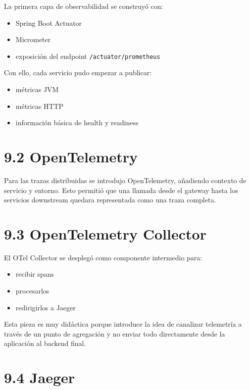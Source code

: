 \documentclass[
a4paper,
12pt]{report}
\providecommand{\tightlist}{%
  \setlength{\itemsep}{0pt}\setlength{\parskip}{0pt}}
\begin{document}
La primera capa de observabilidad se construyó con:

\begin{itemize}
\tightlist
\item
  Spring Boot Actuator
\item
  Micrometer
\item
  exposición del endpoint \texttt{/actuator/prometheus}
\end{itemize}

Con ello, cada servicio pudo empezar a publicar:

\begin{itemize}
\tightlist
\item
  métricas JVM
\item
  métricas HTTP
\item
  información básica de health y readiness
\end{itemize}

\section{9.2 OpenTelemetry}\label{opentelemetry}

Para las trazas distribuidas se introdujo OpenTelemetry, añadiendo
contexto de servicio y entorno. Esto permitió que una llamada desde el
gateway hasta los servicios downstream quedara representada como una
traza completa.

\section{9.3 OpenTelemetry Collector}\label{opentelemetry-collector}

El OTel Collector se desplegó como componente intermedio para:

\begin{itemize}
\tightlist
\item
  recibir spans
\item
  procesarlos
\item
  redirigirlos a Jaeger
\end{itemize}

Esta pieza es muy didáctica porque introduce la idea de canalizar
telemetría a través de un punto de agregación y no enviar todo
directamente desde la aplicación al backend final.

\section{9.4 Jaeger}\label{jaeger}
\end{document}

